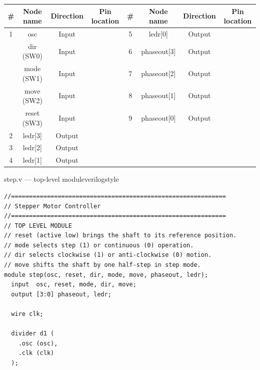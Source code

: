 \begin{procedure}
  \begin{boxedtable}
    \label{tab:exp6-pins}
    {\renewcommand{\arraystretch}{1.5}
      \centering
      \begin{tabular}{cccc|cccc}
        \toprule
        \# & Node name   & Direction & Pin location & \# & Node name   & Direction & Pin location \\
        \midrule
        1  & osc         & Input     &              & 5  & ledr[0]     & Output    &              \\
           & dir (SW0)   & Input     &              & 6  & phaseout[3] & Output    &              \\
           & mode (SW1)  & Input     &              & 7  & phaseout[2] & Output    &              \\
           & move (SW2)  & Input     &              & 8  & phaseout[1] & Output    &              \\
           & reset (SW3) & Input     &              & 9  & phaseout[0] & Output    &              \\
        2  & ledr[3]     & Output    &              &    &             &           &              \\
        3  & ledr[2]     & Output    &              &    &             &           &              \\
        4  & ledr[1]     & Output    &              &    &             &           &              \\
        \bottomrule
      \end{tabular}
    }
  \end{boxedtable}

  \begin{codepanel}{step.v --- top-level module}{verilogstyle}
    \begin{lstlisting}
//============================================================
// Stepper Motor Controller
//============================================================
// TOP LEVEL MODULE
// reset (active low) brings the shaft to its reference position.
// mode selects step (1) or continuous (0) operation.
// dir selects clockwise (1) or anti-clockwise (0) motion.
// move shifts the shaft by one half-step in step mode.
module step(osc, reset, dir, mode, move, phaseout, ledr);
  input  osc, reset, mode, dir, move;
  output [3:0] phaseout, ledr;

  wire clk;

  divider d1 (
    .osc (osc),
    .clk (clk)
  );


\end{lstlisting}
\end{codepanel}
\end{procedure}

